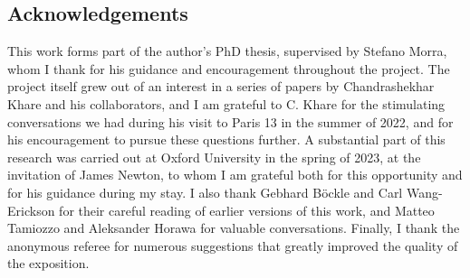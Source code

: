 \documentclass[a4paper, notitlepage, 10pt]{amsart}
\theoremstyle{plain} %
\theoremstyle{definition} %
\theoremstyle{remark} %
\numberwithin{equation}{section}
\begin{document}
\subsection*{Acknowledgements} This work forms part of the author's PhD thesis, supervised by Stefano Morra, whom I thank for his guidance and encouragement throughout the project. The project itself grew out of an interest in a series of papers by Chandrashekhar Khare and his collaborators, and I am grateful to C. Khare for the stimulating conversations we had during his visit to Paris 13 in the summer of 2022, and for his encouragement to pursue these questions further. A substantial part of this research was carried out at Oxford University in the spring of 2023, at the invitation of James Newton, to whom I am grateful both for this opportunity and for his guidance during my stay. I also thank Gebhard Böckle and Carl Wang-Erickson for their careful reading of earlier versions of this work, and Matteo Tamiozzo and Aleksander Horawa for valuable conversations. Finally, I thank the anonymous referee for numerous suggestions that greatly improved the quality of the exposition.
\end{document}
